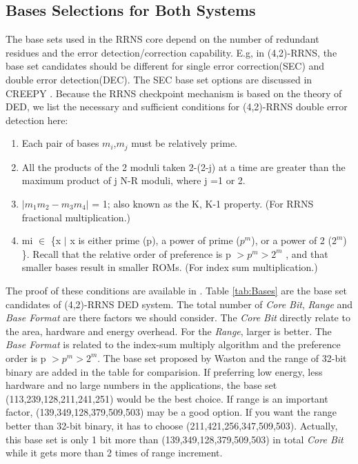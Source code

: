\documentclass{sig-alternate}
\begin{document}
\subsection{Bases Selections for Both Systems}
\label{sub:RRNS bases}
The base sets used in the RRNS core depend on the number of redundant residues and the error detection/correction capability. E.g, in (4,2)-RRNS, the base set candidates should be different for single error correction(SEC) and double error detection(DEC).  The SEC base set options are discussed in CREEPY \cite{DengTACO18}. Because the RRNS checkpoint mechanism is based on the theory of DED, we list the necessary and sufficient conditions for (4,2)-RRNS double error detection here:
\begin{enumerate}
\item Each pair of bases $m_{i}$,$m_{j}$ must be relatively prime.
\item All the products of the 2 moduli taken 2-(2-j) at a time are greater than the maximum product of j N-R moduli, where j =1 or 2. 
\item $|m_{1}m_{2} - m_{3}m_{4}|$ = 1; also known as the K, K-1 property. (For RRNS fractional multiplication.)
\item mi $\in$ \{x $|$ x is either prime (p), a power of prime ($p^{m}$), or a power of 2 ($2^{m}$) \}. Recall that the relative order of preference is p $> p^{m} > 2^{m}$ , and that smaller bases result in smaller ROMs. (For index sum multiplication.) 
\end{enumerate}

The proof of these conditions are available in \cite{WatsonThesis}. Table \ref{tab:Bases} are the base set candidates of (4,2)-RRNS DED system. The total number of \textit{Core Bit}, \textit{Range} and \textit{Base Format} are there factors we should consider. The \textit{Core Bit} directly relate to the area, hardware and energy overhead. For the \textit{Range}, larger is better. The \textit{Base Format} is related to the index-sum multiply algorithm \cite{DengTACO18} and the preference order is p $> p^{m} > 2^{m}$. The base set proposed by Waston\cite{WatsonThesis} and the range of 32-bit binary are added in the table for comparision. If preferring low energy, less hardware and no large numbers in the applications, the base set (113,239,128,211,241,251) would be the best choice. If range is an important factor, (139,349,128,379,509,503) may be a good option. If you want the range better than 32-bit binary, it has to choose (211,421,256,347,509,503).  Actually, this base set is only 1 bit more than (139,349,128,379,509,503) in total \textit{Core Bit} while it gets more than 2 times of range increment. 
\end{document}
